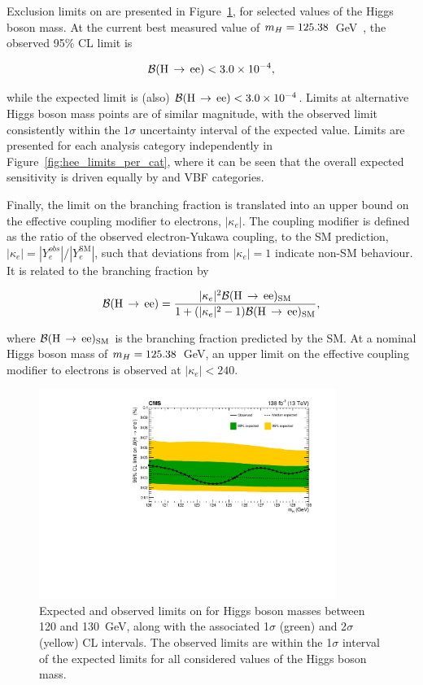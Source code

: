 Exclusion limits on \BHee are presented in Figure~\ref{fig:hee_limits}, for selected values of the Higgs boson mass. At the current best measured value of $m_{H}=125.38$~GeV~\cite{CMS_Hgg_Hmass}, the observed 95\% CL limit is

\begin{equation}
   \mathcal{B}(\mathrm{H}\,\rightarrow\,\mathrm{ee}) < 3.0\times 10^{-4},
\end{equation}

\noindent while the expected limit is (also) $\mathcal{B}(\mathrm{H}\,\rightarrow\,\mathrm{ee}) < 3.0\times 10^{-4}$. Limits at alternative Higgs boson mass points are of similar magnitude, with the observed limit consistently within the $1\sigma$ uncertainty interval of the expected value. Limits are presented for each analysis category independently in Figure~\ref{fig:hee_limits_per_cat}, where it can be seen that the overall expected sensitivity is driven equally by \ggH and VBF categories.

Finally, the limit on the \Hee branching fraction is translated into an upper bound on the effective coupling modifier to electrons, $|\kappa_{e}|$. The coupling modifier is defined as the ratio of the observed electron-Yukawa coupling, to the SM prediction, $|\kappa_{e}|=|Y_{e}^{obs}|/|Y_{e}^{\mathrm{SM}}|$, such that deviations from $|\kappa_{e}|=1$ indicate non-SM behaviour. It is related to the \Hee branching fraction by

\begin{equation}
    \mathcal{B}(\mathrm{H}\,\rightarrow\,\mathrm{ee}) = \frac{|\kappa_{e}|^{2} \mathcal{B}(\mathrm{H}\,\rightarrow\,\mathrm{ee})_{\mathrm{SM}}}{1+(|\kappa_{e}|^{2}-1)\mathcal{B}(\mathrm{H}\,\rightarrow\,\mathrm{ee})_{\mathrm{SM}}},
\end{equation}

\noindent where $\mathcal{B}(\mathrm{H}\,\rightarrow\,\mathrm{ee})_{\mathrm{SM}}$ is the \Hee branching fraction predicted by the SM. At a nominal Higgs boson mass of $m_{H}=125.38$~GeV, an upper limit on the effective coupling modifier to electrons is observed at $|\kappa_{e}|<240$. 

\begin{figure}[htbp!]
\centering
\includegraphics[width=0.86\textwidth]{Figures/Hee/Results/limits/limitVsMh.pdf}\hfill%
\caption[Limits on \BHee as a function of the Higgs boson mass.]{Expected and observed limits on \BHee for Higgs boson masses between 120 and 130~GeV, along with the associated 1$\sigma$ (green) and 2$\sigma$ (yellow) CL intervals. The observed limits are within the 1$\sigma$ interval of the expected limits for all considered values of the Higgs boson mass.}
\label{fig:hee_limits}
\end{figure}


